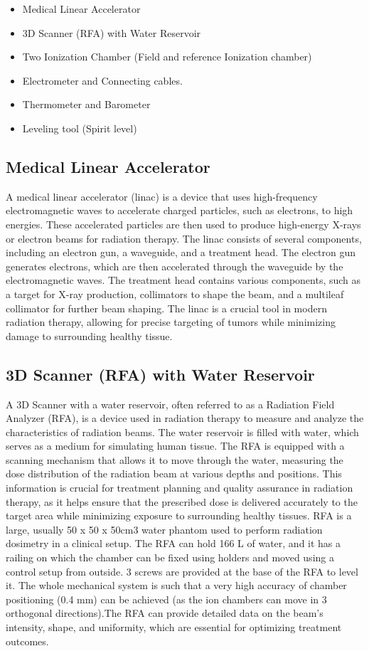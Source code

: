 \begin{itemize}
    \item Medical Linear Accelerator
    \item 3D Scanner (RFA) with Water Reservoir
    \item Two Ionization Chamber (Field and reference Ionization chamber)
    \item Electrometer and Connecting cables.
    \item Thermometer and Barometer
    \item Leveling tool (Spirit level)
\end{itemize}
\subsection{Medical Linear Accelerator}
A medical linear accelerator (linac) is a device that uses high-frequency electromagnetic waves to accelerate charged particles, such as electrons, to high energies. These accelerated particles are then used to produce high-energy X-rays or electron beams for radiation therapy. The linac consists of several components, including an electron gun, a waveguide, and a treatment head. The electron gun generates electrons, which are then accelerated through the waveguide by the electromagnetic waves. The treatment head contains various components, such as a target for X-ray production, collimators to shape the beam, and a multileaf collimator for further beam shaping. The linac is a crucial tool in modern radiation therapy, allowing for precise targeting of tumors while minimizing damage to surrounding healthy tissue.
\subsection{3D Scanner (RFA) with Water Reservoir}
A 3D Scanner with a water reservoir, often referred to as a Radiation Field Analyzer (RFA), is a device used in radiation therapy to measure and analyze the characteristics of radiation beams. The water reservoir is filled with water, which serves as a medium for simulating human tissue. The RFA is equipped with a scanning mechanism that allows it to move through the water, measuring the dose distribution of the radiation beam at various depths and positions. This information is crucial for treatment planning and quality assurance in radiation therapy, as it helps ensure that the prescribed dose is delivered accurately to the target area while minimizing exposure to surrounding healthy tissues. RFA is a large, usually 50 x 50 x 50cm3 water phantom used to perform radiation dosimetry in
a clinical setup. The RFA can hold 166 L of water, and it has a railing on which the chamber can be
fixed using holders and moved using a control setup from outside. 3 screws are provided at the base
of the RFA to level it. The whole mechanical system is such that a very high accuracy of chamber
positioning (0.4 mm) can be achieved (as the ion chambers can move in 3 orthogonal directions).The RFA can provide detailed data on the beam's intensity, shape, and uniformity, which are essential for optimizing treatment outcomes.
